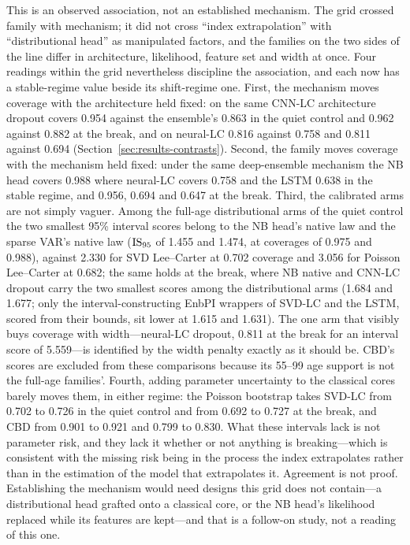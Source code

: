 This is an observed association, not an established mechanism. The grid
crossed family with mechanism; it did not cross ``index extrapolation''
with ``distributional head'' as manipulated factors, and the families on
the two sides of the line differ in architecture, likelihood, feature set
and width at once. Four readings within the grid nevertheless discipline
the association, and each now has a stable-regime value beside its
shift-regime one. First, the mechanism moves coverage with the
architecture held fixed: on the same CNN-LC architecture dropout covers
0.954 against the ensemble's 0.863 in the quiet control and 0.962
against 0.882 at the break, and on neural-LC 0.816 against 0.758 and
0.811 against 0.694 (Section~\ref{sec:results-contrasts}). Second, the
family moves coverage with the mechanism held fixed: under the same
deep-ensemble mechanism the NB head covers 0.988 where neural-LC covers
0.758 and the LSTM 0.638 in the stable regime, and 0.956, 0.694 and
0.647 at the break. Third, the calibrated arms are not simply vaguer.
Among the full-age distributional arms of the quiet control the two
smallest 95\% interval scores belong to the NB head's native law and the
sparse VAR's native law ($\operatorname{IS}_{95}$ of 1.455 and 1.474, at coverages of
0.975 and 0.988), against 2.330 for SVD Lee--Carter at 0.702 coverage and
3.056 for Poisson Lee--Carter at 0.682; the same holds at the break, where
NB native and CNN-LC dropout carry the two smallest scores among the
distributional arms (1.684 and 1.677; only the interval-constructing
EnbPI wrappers of SVD-LC and the LSTM, scored from their bounds, sit
lower at 1.615 and 1.631). The one arm that visibly buys coverage with
width---neural-LC dropout, 0.811 at the break for an interval score of
5.559---is identified by the width penalty exactly as it should be. CBD's
scores are excluded from these comparisons because its 55--99 age support
is not the full-age families'. Fourth, adding parameter uncertainty to
the classical cores barely moves them, in either regime: the Poisson
bootstrap takes SVD-LC from 0.702 to 0.726 in the quiet control and from
0.692 to 0.727 at the break, and CBD from 0.901 to 0.921 and 0.799 to
0.830. What these intervals lack is not parameter risk, and they lack it
whether or not anything is breaking---which is consistent with the
missing risk being in the process the index extrapolates rather than in
the estimation of the model that extrapolates it. Agreement is not proof.
Establishing the mechanism would need designs this grid does not
contain---a distributional head grafted onto a classical core, or the NB
head's likelihood replaced while its features are kept---and that is a
follow-on study, not a reading of this one.

